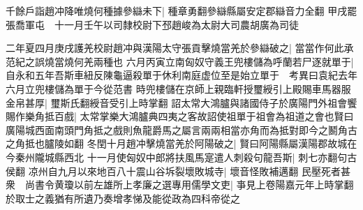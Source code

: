 千餘戶詣趙冲降唯燒何種據參䜌未下|{
	種章勇翻參䜌縣屬安定郡䜌音力全翻}
甲戌罷張喬軍屯　十一月壬午以司隸校尉下邳趙峻為太尉大司農胡廣為司徒

二年夏四月庚戌護羌校尉趙冲與漢陽太守張貢擊燒當羌於參䜌破之|{
	當當作何此承范紀之誤燒當燒何羌兩種也}
六月丙寅立南匈奴守義王兜樓儲為呼蘭若尸逐就單于|{
	自永和五年吾斯車紐反陳龜逼殺單于休利南庭虚位至是始立單于　考異曰袁紀去年六月立兜樓儲為單于今從范書}
時兜樓儲在京師上親臨軒授璽綬引上殿賜車馬器服金帛甚厚|{
	璽斯氏翻綬音受引上時掌翻}
詔太常大鴻臚與諸國侍子於廣陽門外祖會饗賜作樂角抵百戲|{
	太常掌樂大鴻臚典四夷之客故詔使祖單于祖會為祖道之會也賢曰廣陽城西面南頭門角抵之戲則魚龍爵馬之屬言兩兩相當亦角而為抵對即今之鬭角古之角抵也臚陵如翻}
冬閏十月趙冲擊燒當羌於阿陽破之|{
	賢曰阿陽縣屬漢陽郡故城在今秦州隴城縣西北}
十一月使匈奴中郎將扶風馬寔遣人刺殺句龍吾斯|{
	刺七亦翻句古侯翻}
凉州自九月以來地百八十震山谷坼裂壞敗城寺|{
	壞音怪敗補邁翻}
民壓死者甚衆　尚書令黄瓊以前左雄所上孝廉之選專用儒學文吏|{
	亊見上卷陽嘉元年上時掌翻}
於取士之義猶有所遺乃奏增孝悌及能從政為四科帝從之

